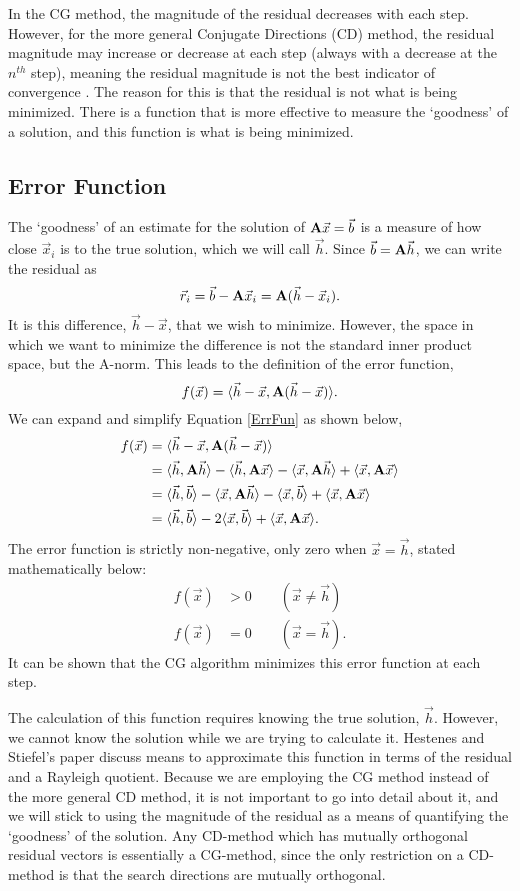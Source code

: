 \documentclass[11pt,letterpaper,oneside,notitlepage]{article}	%
\newcommand{\bfa}{{\bf A}}						%
\newcommand{\ip}[2]{\langle \vec #1,\vec #2 \rangle}	%
\newcommand{\aip}[2]{\langle \vec #1,\bfa\vec #2 \rangle}	%
\newcommand{\eq}[1]{Equation \eqref{#1}}		%
\newcommand{\pindent}[1]{\hspace{6mm}}  		%
\numberwithin{equation}{section}				%
\begin{document}
In the CG method, the magnitude of the residual decreases with each step. However, for the more general Conjugate Directions (CD) method, the residual magnitude may increase or decrease at each step (always with a decrease at the $n^{th}$ step), meaning the residual magnitude is not the best indicator of convergence \cite{CG1952}. The reason for this is that the residual is not what is being minimized. There is a function that is more effective to measure the `goodness' of a solution, and this function is what is being minimized.

\subsection{Error Function}%
\pindent{}The `goodness' of an estimate for the solution of $\bfa\vec x = \vec b$ is a measure of how close $\vec x_i$ is to the true solution, which we will call $\vec h$. Since $\vec b=\bfa\vec h$, we can write the residual as
\[
\vec r_i = \vec b - \bfa \vec x_i = \bfa(\vec h - \vec x_i)
.\]
It is this difference, $\vec h-\vec x$, that we wish to minimize. However, the space in which we want to minimize the difference is not the standard inner product space, but the A-norm. This leads to the definition of the error function,
\begin{equation}
f(\vec x) = \langle \vec h-\vec x,\bfa(\vec h-\vec x)\rangle \label{ErrFun}
.\end{equation}
We can expand and simplify \eq{ErrFun} as shown below,
\begin{align*}
f(\vec x) &=\langle \vec h-\vec x,\bfa(\vec h-\vec x)\rangle \\
&=\aip{h}{h}-\aip{h}{x}-\aip{x}{h}+\aip{x}{x} \\
&=\ip{h}{b}-\aip{x}{h}-\ip{x}{b}+\aip{x}{x} \\
&=\ip{h}{b}-2\ip{x}{b}+\aip{x}{x}
.\end{align*}
The error function is strictly non-negative, only zero when $\vec x = \vec h$\cite{CG1952}, stated mathematically below:
\begin{align*}
f(\vec x) &> 0 \qquad (\vec x \ne \vec h) \\
f(\vec x) &= 0 \qquad (\vec x = \vec h)
.\end{align*}
It can be shown that the CG algorithm minimizes this error function at each step\cite{Trefethen97}.

The calculation of this function requires knowing the true solution, $\vec h$. However, we cannot know the solution while we are trying to calculate it. Hestenes and Stiefel's paper discuss means to approximate this function in terms of the residual and a Rayleigh quotient\cite{CG1952}. Because we are employing the CG method instead of the more general CD method, it is not important to go into detail about it, and we will stick to using the magnitude of the residual as a means of quantifying the `goodness' of the solution.  Any CD-method which has mutually orthogonal residual vectors is essentially a CG-method\cite{CG1952}, since the only restriction on a CD-method is that the search directions are mutually orthogonal.
\end{document}
